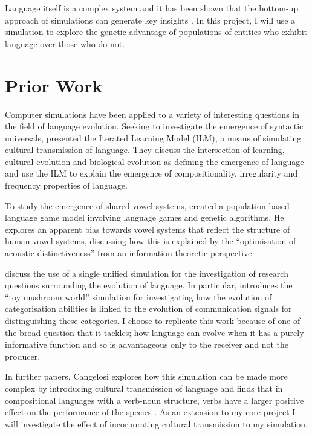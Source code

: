 \documentclass[12pt,a4paper,twoside,openright]{report}
\begin{document}
Language itself is a complex system and it has been shown that the bottom-up approach of simulations can generate key insights \citep{langton1997artificial}. In this project, I will use a simulation to explore the genetic advantage of populations of entities who exhibit language over those who do not.

\section{Prior Work}

Computer simulations have been applied to a variety of interesting questions in the field of language evolution. Seeking to investigate the emergence of syntactic universals, \citet{kirby2002emergence} presented the Iterated Learning Model (ILM), a means of simulating cultural transmission of language. They discuss the intersection of learning, cultural evolution and biological evolution as defining the emergence of language and use the ILM to explain the emergence of compositionality, irregularity and frequency properties of language.

To study the emergence of shared vowel systems, \citet{de1997generating} created a population-based language game model involving language games and genetic algorithms. He explores an apparent bias towards vowel systems that reflect the structure of human vowel systems, discussing how this is explained by the ``optimisation of acoustic distinctiveness'' from an information-theoretic perspective.

\citet{parisi2002unified}  discuss the use of a single unified simulation for the investigation of research questions surrounding the evolution of language. In particular, \citet{Cangelosi1998} introduces the ``toy mushroom world'' simulation for investigating how the evolution of categorisation abilities is linked to the evolution of communication signals for distinguishing these categories. I choose to replicate this work because of one of the broad question that it tackles; how language can evolve when it has a purely informative function and so is  advantageous only to the receiver and not the producer. 

In further papers, Cangelosi explores how this simulation can be made more complex by introducing cultural transmission of language and finds that in compositional languages with a verb-noun structure, verbs have a larger positive effect on the performance of the species \citep{cangelosi2001evolution}. As an extension to my core project I will investigate the effect of incorporating cultural transmission to my simulation.
\end{document}
